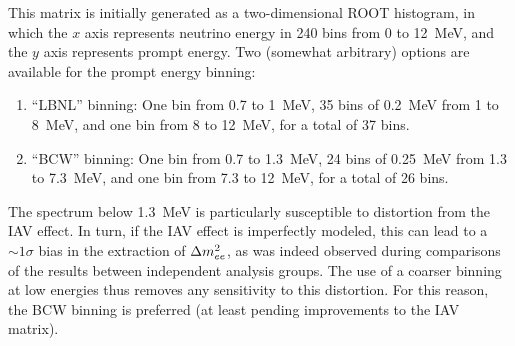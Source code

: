 \documentclass[../thesis.tex]{subfiles}
\begin{document}
This matrix is initially generated as a two-dimensional ROOT histogram, in which
the $x$ axis represents neutrino energy in 240 bins from 0 to 12~MeV, and the
$y$ axis represents prompt energy. Two (somewhat arbitrary) options are
available for the prompt energy binning:

\begin{enumerate}
\item ``LBNL'' binning: One bin from 0.7 to 1~MeV, 35 bins of 0.2~MeV from 1 to
  8~MeV, and one bin from 8 to 12~MeV, for a total of 37 bins.
\item ``BCW'' binning: One bin from 0.7 to 1.3~MeV, 24 bins of 0.25~MeV from 1.3
  to 7.3~MeV, and one bin from 7.3 to 12~MeV, for a total of 26 bins.
\end{enumerate}

The spectrum below 1.3~MeV is particularly susceptible to distortion from the
IAV effect. In turn, if the IAV effect is imperfectly modeled, this can lead to
a $\sim1\sigma$ bias in the extraction of $\Delta m^2_{ee}$, as was indeed observed
during comparisons of the results between independent analysis groups. The use
of a coarser binning at low energies thus removes any sensitivity to this
distortion. For this reason, the BCW binning is preferred (at least pending
improvements to the IAV matrix).

\begin{comment}
  I don't see any reason to mention the fact that a finer binning (2880 instead
  of 240) is used internally by the toy MC when generating this matrix. With the
  standard 240 bins, the edges line up with both the LBNL and BCW edges, so
  there shouldn't be any benefit from using a finer binning.

  deleted: Internally, the toy MC normally represents both neutrino and prompt
  energy using 240 bins (of 50~keV) from 0 to 12~MeV.
\end{comment}
\end{document}
